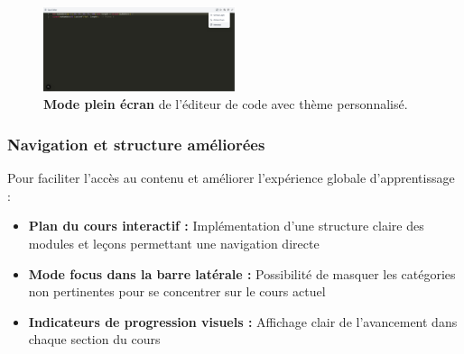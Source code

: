 \begin{figure}[H]
  \centering
  \includegraphics[width=0.5\textwidth,keepaspectratio]{old-reports/week_4_img/expended.jpeg}
  \caption{\textbf{Mode plein écran} de l'éditeur de code avec thème personnalisé.}
  \label{fig:code_editor_fullscreen}
\end{figure}

\subsubsection{Navigation et structure améliorées}

Pour faciliter l'accès au contenu et améliorer l'expérience globale d'apprentissage :
\begin{itemize}
    \item \textbf{Plan du cours interactif :} Implémentation d'une structure claire des modules et leçons permettant une navigation directe
    \item \textbf{Mode focus dans la barre latérale :} Possibilité de masquer les catégories non pertinentes pour se concentrer sur le cours actuel
    \item \textbf{Indicateurs de progression visuels :} Affichage clair de l'avancement dans chaque section du cours
\end{itemize}

